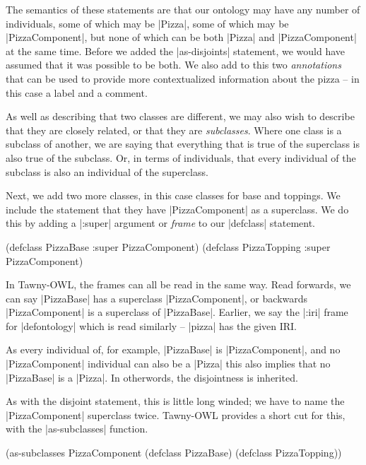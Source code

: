 The semantics of these statements are that our ontology may have any
number of individuals, some of which may be |Pizza|, some of which may
be |PizzaComponent|, but none of which can be both |Pizza| and
|PizzaComponent| at the same time. Before we added the |as-disjoints|
statement, we would have assumed that it was possible to be both. We
also add to this two \emph{annotations} that can be used to provide
more contextualized information about the pizza -- in this case a
label and a comment.

As well as describing that two classes are different, we may also wish
to describe that they are closely related, or that they are
\emph{subclasses}. Where one class is a subclass of another, we are saying
that everything that is true of the superclass is also true of the
subclass. Or, in terms of individuals, that every individual of the
subclass is also an individual of the superclass.

Next, we add two more classes, in this case classes for base and
toppings. We include the statement that they have |PizzaComponent| as
a superclass. We do this by adding a |:super| argument or \emph{frame}
to our |defclass| statement.

\begin{tawnyexample}
(defclass PizzaBase
  :super PizzaComponent)
(defclass PizzaTopping
  :super PizzaComponent)
\end{tawnyexample}

In Tawny-OWL, the frames can all be read in the same way. Read
forwards, we can say |PizzaBase| has a superclass |PizzaComponent|, or
backwards |PizzaComponent| is a superclass of |PizzaBase|. Earlier, we
say the |:iri| frame for |defontology| which is read similarly --
|pizza| has the given IRI.

As every individual of, for example, |PizzaBase| is |PizzaComponent|, and no
|PizzaComponent| individual can also be a |Pizza| this also implies that no
|PizzaBase| is a |Pizza|. In otherwords, the disjointness is inherited.

As with the disjoint statement, this is little long winded; we have to name
the |PizzaComponent| superclass twice. Tawny-OWL provides a short cut for
this, with the |as-subclasses| function.

\begin{tawnyexample}
(as-subclasses
 PizzaComponent
 (defclass PizzaBase)
 (defclass PizzaTopping))
\end{tawnyexample}

